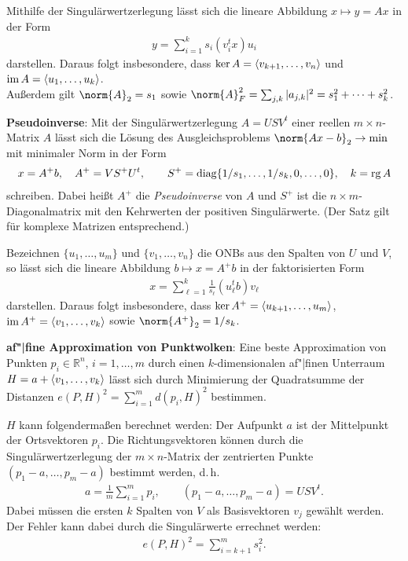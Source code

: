 Mithilfe der Singulärwertzerlegung lässt sich die lineare Abbildung
$x \mapsto y = Ax$ in der Form
\begin{align*}
    y = \sum_{i=1}^k s_i (v_i^t x) u_i
\end{align*}
darstellen.
Daraus folgt insbesondere, dass $\operatorname{ker} A = \left\langle v_{k+1}, \dotsc, v_n\right\rangle$ und
$\operatorname{im} A = \left\langle u_1, \dotsc, u_k\right\rangle$. \\
Außerdem gilt $\norm{A}_2 = s_1$ sowie
$\norm{A}_F^2 = \sum_{j,k} |a_{j,k}|^2 = s_1^2 + \dotsb + s_k^2$.

\linie

\textbf{Pseudoinverse}:
Mit der Singulärwertzerlegung $A = USV^t$ einer reellen $m \times n$-Matrix
$A$ lässt sich die Lösung des Ausgleichsproblems
$\norm{Ax - b}_2 \rightarrow \min$ mit minimaler Norm in der Form
\begin{align*}
    x = A^+ b, \quad
    A^+ = V S^+ U^t, \qquad
    S^+ = \operatorname{diag}\{1/s_1, \dotsc, 1/s_k, 0, \dotsc, 0\}, \quad
    k = \operatorname{rg} A
\end{align*}
schreiben.
Dabei heißt $A^+$ die \emph{Pseudoinverse} von $A$ und $S^+$ ist die
$n \times m$-Diagonalmatrix mit den Kehrwerten der positiven Singulärwerte.
(Der Satz gilt für komplexe Matrizen entsprechend.)

Bezeichnen $\{u_1, \dotsc, u_m\}$ und $\{v_1, \dotsc, v_n\}$ die ONBs aus
den Spalten von $U$ und $V$, so lässt sich die lineare Abbildung
$b \mapsto x = A^+ b$ in der faktorisierten Form
\begin{align*}
    x = \sum_{\ell=1}^k \frac{1}{s_\ell} (u_\ell^t b) v_\ell
\end{align*}
darstellen.
Daraus folgt insbesondere, dass $\operatorname{ker} A^+ = \left\langle u_{k+1}, \dotsc, u_m\right\rangle$,
$\operatorname{im} A^+ = \left\langle v_1, \dotsc, v_k\right\rangle$ sowie $\norm{A^+}_2 = 1/s_k$.

\linie

\textbf{af"|fine Approximation von Punktwolken}:
Eine beste Approximation von Punkten $p_i \in \mathbb{R}^n$, $i = 1, \dotsc, m$
durch einen $k$-dimensionalen af"|finen Unterraum
$H = a + \left\langle v_1, \dotsc, v_k\right\rangle$ lässt sich durch Minimierung der
Quadratsumme der Distanzen $e(P, H)^2 = \sum_{i=1}^m d(p_i, H)^2$ bestimmen.

$H$ kann folgendermaßen berechnet werden:
Der Aufpunkt $a$ ist der Mittelpunkt der Ortsvektoren $p_i$.
Die Richtungsvektoren können durch die Singulärwertzerlegung der
$m \times n$-Matrix der zentrierten Punkte
$(p_1 - a, \dotsc, p_m - a)$ bestimmt werden, d.\,h.
\begin{align*}
    a = \frac{1}{m} \sum_{i=1}^m p_i, \qquad
    (p_1 - a, \dotsc, p_m - a) = U S V^t.
\end{align*}
Dabei müssen die ersten $k$ Spalten von $V$ als Basisvektoren $v_j$ gewählt
werden. \\
Der Fehler kann dabei durch die Singulärwerte errechnet werden:
\begin{align*}
    e(P, H)^2 = \sum_{i=k+1}^m s_i^2.
\end{align*}

\pagebreak
